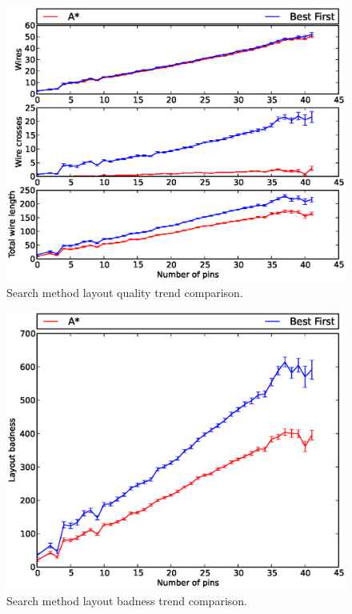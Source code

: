 \begin{figure}
\begin{center}
\includegraphics[width=\textwidth]{Images/search_quality_trend_comparison.eps}
\caption[Search method layout quality trend comparison]{Search method layout
quality trend comparison.}
\label{fig:search_quality_trend}
\end{center}
\end{figure}

\begin{figure}
\begin{center}
\includegraphics[width=\textwidth]{Images/search_badness_trend_comparison.eps}
\caption[Search method layout badness trend comparison]{Search method layout
badness trend comparison.}
\label{fig:search_badness_trend}
\end{center}
\end{figure}

